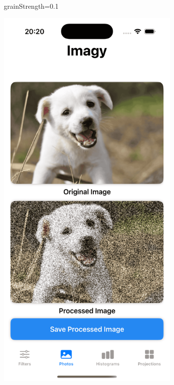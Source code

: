 \documentclass[a4paper]{article}
\begin{document}
\begin{figure}[H]
\begin{subfigure}{0.2\textwidth}
        \caption{grainStrength=0.1}
        \label{fig:dog_film_grain_0}
    \end{subfigure}
    \hfill
    \begin{subfigure}{0.2\textwidth}
        \centering
        \includegraphics[width=\linewidth]{images/dog_film_grain_0.5.png}

\end{subfigure}
\end{figure}
\end{document}
